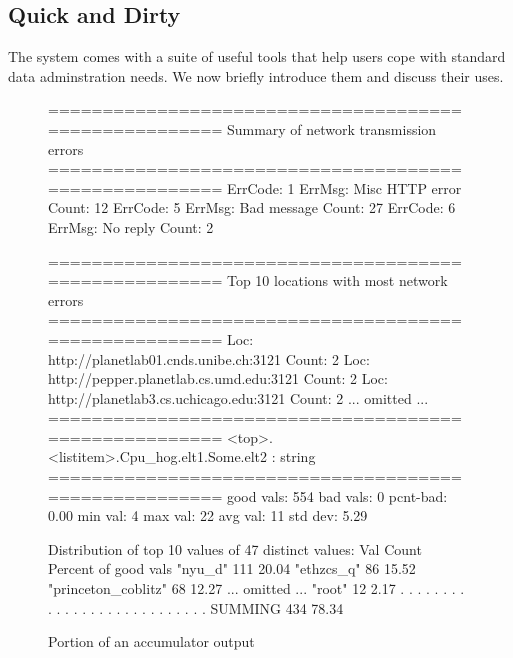 \subsection{Quick and Dirty}
\label{sec:tools}
The \padsd{} system comes with a suite of useful tools that help users cope with standard data adminstration needs. We now briefly introduce them and discuss their uses. 


\begin{figure}[th]
\centering
\begin{scodebox}
======================================================
Summary of network transmission errors
======================================================
ErrCode: 1      ErrMsg: Misc HTTP error Count: 12
ErrCode: 5      ErrMsg: Bad message     Count: 27
ErrCode: 6      ErrMsg: No reply        Count: 2

======================================================
Top 10 locations with most network errors
======================================================
Loc: http://planetlab01.cnds.unibe.ch:3121    Count: 2
Loc: http://pepper.planetlab.cs.umd.edu:3121  Count: 2
Loc: http://planetlab3.cs.uchicago.edu:3121   Count: 2
... omitted ...
======================================================
<top>.<listitem>.Cpu_hog.elt1.Some.elt2 : string
======================================================
good vals: 554        bad vals: 0      pcnt-bad: 0.00%
min val: 4   max val: 22   avg val: 11   std dev: 5.29   

Distribution of top 10 values of 47 distinct values:
  Val                Count        Percent of good vals
"nyu_d"              111                        20.04%
"ethzcs_q"           86                         15.52%
"princeton_coblitz"  68                         12.27%
... omitted ...
"root"               12                          2.17%
. . . . . . . . . . . . . . . . . . . . . . . . . . . 
SUMMING              434                        78.34%
\end{scodebox}
\caption{Portion of an accumulator output} \label{fig:acc}
\end{figure} 


